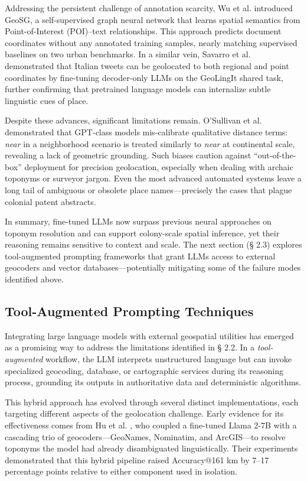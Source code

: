 Addressing the persistent challenge of annotation scarcity, Wu et al.
\citep{wu2025geosg} introduced GeoSG, a self-supervised graph neural
network that learns spatial semantics from Point-of-Interest (POI)--text
relationships. This approach predicts document coordinates without any
annotated training samples, nearly matching supervised baselines on two
urban benchmarks. In a similar vein, Savarro et al.
\citep{savarro2024geolingit} demonstrated that Italian tweets can be
geolocated to both regional and point coordinates by fine-tuning
decoder-only LLMs on the GeoLingIt shared task, further confirming that
pretrained language models can internalize subtle linguistic cues of
place.

Despite these advances, significant limitations remain. O'Sullivan et
al. \citep{Osullivan2024_metric} demonstrated that GPT-class models
mis-calibrate qualitative distance terms: \emph{near} in a neighborhood
scenario is treated similarly to \emph{near} at continental scale,
revealing a lack of geometric grounding. Such biases caution against
``out-of-the-box'' deployment for precision geolocation, especially when
dealing with archaic toponyms or surveyor jargon. Even the most advanced
automated systems leave a long tail of ambiguous or obsolete place
names---precisely the cases that plague colonial patent abstracts.

In summary, fine-tuned LLMs now surpass previous neural approaches on
toponym resolution and can support colony-scale spatial inference, yet
their reasoning remains sensitive to context and scale. The next section
(§ 2.3) explores tool-augmented prompting frameworks that grant LLMs
access to external geocoders and vector databases---potentially
mitigating some of the failure modes identified above.

\subsection{Tool-Augmented Prompting
Techniques}\label{tool-augmented-prompting-techniques}

Integrating large language models with external geospatial utilities has
emerged as a promising way to address the limitations identified in §
2.2. In a \emph{tool-augmented} workflow, the LLM interprets
unstructured language but can invoke specialized geocoding, database, or
cartographic services during its reasoning process, grounding its
outputs in authoritative data and deterministic algorithms.

This hybrid approach has evolved through several distinct
implementations, each targeting different aspects of the geolocation
challenge. Early evidence for its effectiveness comes from Hu et al.
\citep{Hu2024_toponym_llm}, who coupled a fine-tuned Llama 2-7B with a
cascading trio of geocoders---GeoNames, Nominatim, and ArcGIS---to
resolve toponyms the model had already disambiguated linguistically.
Their experiments demonstrated that this hybrid pipeline raised
Accuracy@161 km by 7--17 percentage points relative to either component
used in isolation.

